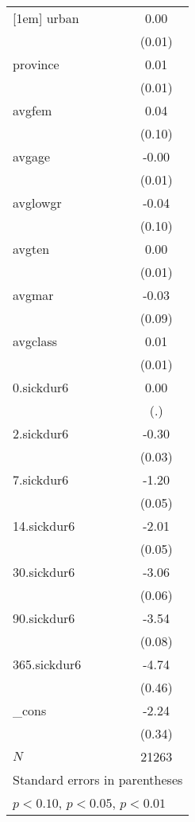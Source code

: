 \documentclass{article}
\begin{document}
{\begin{tabular}{l*{1}{c}}
[1em]
urban       &        0.00         \\
            &      (0.01)         \\
[1em]
province    &        0.01         \\
            &      (0.01)         \\
[1em]
avgfem      &        0.04         \\
            &      (0.10)         \\
[1em]
avgage      &       -0.00         \\
            &      (0.01)         \\
[1em]
avglowgr    &       -0.04         \\
            &      (0.10)         \\
[1em]
avgten      &        0.00         \\
            &      (0.01)         \\
[1em]
avgmar      &       -0.03         \\
            &      (0.09)         \\
[1em]
avgclass    &        0.01         \\
            &      (0.01)         \\
[1em]
0.sickdur6  &        0.00         \\
            &         (.)         \\
[1em]
2.sickdur6  &       -0.30\sym{***}\\
            &      (0.03)         \\
[1em]
7.sickdur6  &       -1.20\sym{***}\\
            &      (0.05)         \\
[1em]
14.sickdur6 &       -2.01\sym{***}\\
            &      (0.05)         \\
[1em]
30.sickdur6 &       -3.06\sym{***}\\
            &      (0.06)         \\
[1em]
90.sickdur6 &       -3.54\sym{***}\\
            &      (0.08)         \\
[1em]
365.sickdur6&       -4.74\sym{***}\\
            &      (0.46)         \\
[1em]
\_cons      &       -2.24\sym{***}\\
            &      (0.34)         \\
\hline
\(N\)       &       21263         \\
\hline\hline
\multicolumn{2}{l}{\footnotesize Standard errors in parentheses}\\
\multicolumn{2}{l}{\footnotesize \sym{*} \(p<0.10\), \sym{**} \(p<0.05\), \sym{***} \(p<0.01\)}\\
\end{tabular}
}
\end{document}
